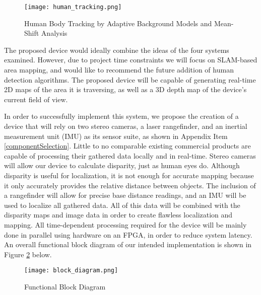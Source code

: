 \begin{figure}[H]
	\centerline{\texttt{[image: human\_tracking.png]}}
	\caption{\small{Human Body Tracking by Adaptive Background Models and Mean-Shift Analysis \cite{porikli}}}
	\label{human_tracking}
\end{figure}

The proposed device would ideally combine the ideas of the four systems examined. However, due to project time constraints we will focus on SLAM-based area mapping, and would like to recommend the future addition of human detection algorithms. The proposed device will be capable of generating real-time 2D maps of the area it is traversing, as well as a 3D depth map of the device’s current field of view.
\par
In order to successfully implement this system, we propose the creation of a device that will rely on two stereo cameras, a laser rangefinder, and an inertial measurement unit (IMU) as its sensor suite, as shown in Appendix Item \ref{componentSelection}. Little to no comparable existing commercial products are capable of processing their gathered data locally and in real-time. Stereo cameras will allow our device to calculate disparity, just as human eyes do. Although disparity is useful for localization, it is not enough for accurate mapping because it only accurately provides the relative distance between objects. The inclusion of a rangefinder will allow for precise base distance readings, and an IMU will be used to localize all gathered data. All of this data will be combined with the disparity maps and image data in order to create flawless localization and mapping. All time-dependent processing required for the device will be mainly done in parallel using hardware on an FPGA, in order to reduce system latency. An overall functional block diagram of our intended implementation is shown in Figure \ref{orig_bd} below.

\begin{figure}[H]
	\centerline{\texttt{[image: block\_diagram.png]}}
	\caption{Functional Block Diagram}
	\label{orig_bd}
\end{figure}

